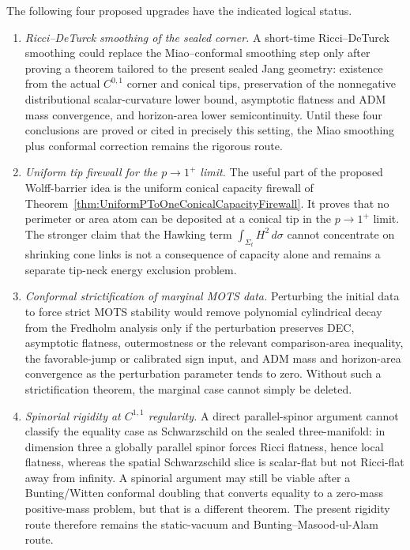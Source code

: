 \begin{theorem}\label{thm:HardeningAudit}
The following four proposed upgrades have the indicated logical status.
\begin{enumerate}
    \item \emph{Ricci--DeTurck smoothing of the sealed corner.}  A short-time
    Ricci--DeTurck smoothing could replace the Miao--conformal smoothing step
    only after proving a theorem tailored to the present sealed Jang geometry:
    existence from the actual \(C^{0,1}\) corner and conical tips, preservation
    of the nonnegative distributional scalar-curvature lower bound, asymptotic
    flatness and ADM mass convergence, and horizon-area lower semicontinuity.
    Until these four conclusions are proved or cited in precisely this setting,
    the Miao smoothing plus conformal correction remains the rigorous route.

    \item \emph{Uniform tip firewall for the \(p\to1^+\) limit.}  The useful
    part of the proposed Wolff-barrier idea is the uniform conical capacity
    firewall of Theorem~\ref{thm:UniformPToOneConicalCapacityFirewall}.  It
    proves that no perimeter or area atom can be deposited at a conical tip in
    the \(p\to1^+\) limit.  The stronger claim that the Hawking term
    \(\int_{\Sigma_t}H^2\,d\sigma\) cannot concentrate on shrinking cone links
    is not a consequence of capacity alone and remains a separate tip-neck
    energy exclusion problem.

    \item \emph{Conformal strictification of marginal MOTS data.}  Perturbing
    the initial data to force strict MOTS stability would remove polynomial
    cylindrical decay from the Fredholm analysis only if the perturbation
    preserves DEC, asymptotic flatness, outermostness or the relevant
    comparison-area inequality, the favorable-jump or calibrated sign input,
    and ADM mass and horizon-area convergence as the perturbation parameter
    tends to zero.  Without such a strictification theorem, the marginal case
    cannot simply be deleted.

    \item \emph{Spinorial rigidity at \(C^{1,1}\) regularity.}  A direct
    parallel-spinor argument cannot classify the equality case as Schwarzschild
    on the sealed three-manifold: in dimension three a globally parallel spinor
    forces Ricci flatness, hence local flatness, whereas the spatial
    Schwarzschild slice is scalar-flat but not Ricci-flat away from infinity.
    A spinorial argument may still be viable after a Bunting/Witten conformal
    doubling that converts equality to a zero-mass positive-mass problem, but
    that is a different theorem.  The present rigidity route therefore remains
    the static-vacuum and Bunting--Masood-ul-Alam route.
\end{enumerate}
\end{theorem}

